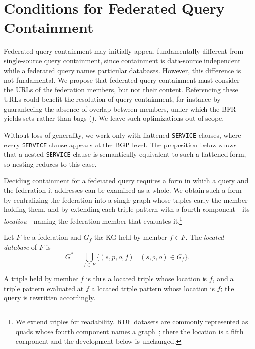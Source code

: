 \section{Conditions for Federated Query Containment}\label{sec:federated_queries_query_containment}

Federated query containment may initially appear fundamentally different from single-source query containment, since containment is data-source independent while a federated query names particular databases.
However, this difference is not fundamental.
We propose that federated query containment must consider the URLs of the federation members, but not their content.
Referencing these URLs could benefit the resolution of query containment, for instance by guaranteeing the absence of overlap between members, under which the \ac{BFR} yields sets rather than bags ().
We leave such optimizations out of scope.

Without loss of generality, we work only with flattened \texttt{SERVICE} clauses, where every \texttt{SERVICE} clause appears at the \ac{BGP} level.
The proposition below shows that a nested \texttt{SERVICE} clause is semantically equivalent to such a flattened form, so nesting reduces to this case.




Deciding containment for a federated query requires a form in which a query and the federation it addresses can be examined as a whole.
We obtain such a form by centralizing the federation into a single graph whose triples carry the member holding them, and by extending each triple pattern with a fourth component---its \emph{location}---naming the federation member that evaluates it.\footnote{We extend triples for readability. \ac{RDF} datasets are commonly represented as quads whose fourth component names a graph~\cite{w3ConceptsAbstract}; there the location is a fifth component and the development below is unchanged.}

\begin{definition}\label{def_located_db}
  Let $F$ be a federation and $G_f$ the \ac{KG} held by member $f \in F$.
  The \emph{located database} of $F$ is
  \[
    G^{*} = \bigcup_{f \in F} \{(s,p,o,f) \mid (s,p,o) \in G_f\}.
  \]
\end{definition}

A triple held by member $f$ is thus a located triple whose location is $f$, and a triple pattern evaluated at $f$ a located triple pattern whose location is $f$; the query is rewritten accordingly.


